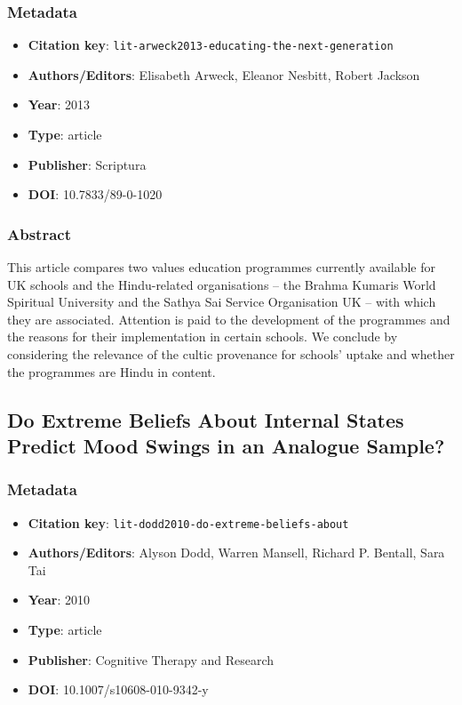 \subsubsection*{Metadata}
\begin{itemize}
  \item \textbf{Citation key}: \texttt{lit-arweck2013-educating-the-next-generation}
  \item \textbf{Authors/Editors}: Elisabeth Arweck, Eleanor Nesbitt, Robert Jackson
  \item \textbf{Year}: 2013
  \item \textbf{Type}: article
  \item \textbf{Publisher}: Scriptura
  \item \textbf{DOI}: 10.7833/89-0-1020
\end{itemize}
\subsubsection*{Abstract}
This article compares two values education programmes currently available for UK schools and the Hindu-related organisations – the Brahma Kumaris World Spiritual University and the Sathya Sai Service Organisation UK – with which they are associated. Attention is paid to the development of the programmes and the reasons for their implementation in certain schools. We conclude by considering the relevance of the cultic provenance for schools’ uptake and whether the programmes are Hindu in content.

\subsection{Do Extreme Beliefs About Internal States Predict Mood Swings in an Analogue Sample?}\label{lit:lit-dodd2010-do-extreme-beliefs-about}
\subsubsection*{Metadata}
\begin{itemize}
  \item \textbf{Citation key}: \texttt{lit-dodd2010-do-extreme-beliefs-about}
  \item \textbf{Authors/Editors}: Alyson Dodd, Warren Mansell, Richard P. Bentall, Sara Tai
  \item \textbf{Year}: 2010
  \item \textbf{Type}: article
  \item \textbf{Publisher}: Cognitive Therapy and Research
  \item \textbf{DOI}: 10.1007/s10608-010-9342-y
\end{itemize}

